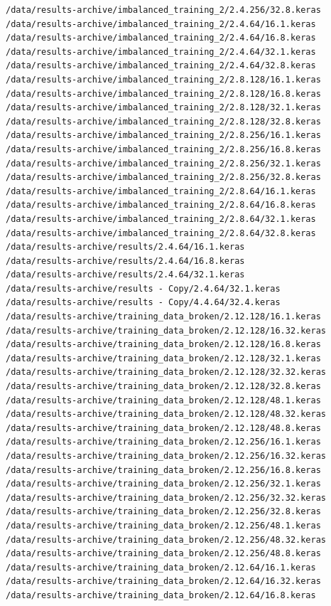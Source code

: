 \documentclass[12pt]{article}
\begin{document}
\begin{lstlisting}[style=logstyle, caption={List of failed trained models. See \ref{issues}}, label={lst:model-list}]
/data/results-archive/imbalanced_training_2/2.4.256/32.8.keras
/data/results-archive/imbalanced_training_2/2.4.64/16.1.keras
/data/results-archive/imbalanced_training_2/2.4.64/16.8.keras
/data/results-archive/imbalanced_training_2/2.4.64/32.1.keras
/data/results-archive/imbalanced_training_2/2.4.64/32.8.keras
/data/results-archive/imbalanced_training_2/2.8.128/16.1.keras
/data/results-archive/imbalanced_training_2/2.8.128/16.8.keras
/data/results-archive/imbalanced_training_2/2.8.128/32.1.keras
/data/results-archive/imbalanced_training_2/2.8.128/32.8.keras
/data/results-archive/imbalanced_training_2/2.8.256/16.1.keras
/data/results-archive/imbalanced_training_2/2.8.256/16.8.keras
/data/results-archive/imbalanced_training_2/2.8.256/32.1.keras
/data/results-archive/imbalanced_training_2/2.8.256/32.8.keras
/data/results-archive/imbalanced_training_2/2.8.64/16.1.keras
/data/results-archive/imbalanced_training_2/2.8.64/16.8.keras
/data/results-archive/imbalanced_training_2/2.8.64/32.1.keras
/data/results-archive/imbalanced_training_2/2.8.64/32.8.keras
/data/results-archive/results/2.4.64/16.1.keras
/data/results-archive/results/2.4.64/16.8.keras
/data/results-archive/results/2.4.64/32.1.keras
/data/results-archive/results - Copy/2.4.64/32.1.keras
/data/results-archive/results - Copy/4.4.64/32.4.keras
/data/results-archive/training_data_broken/2.12.128/16.1.keras
/data/results-archive/training_data_broken/2.12.128/16.32.keras
/data/results-archive/training_data_broken/2.12.128/16.8.keras
/data/results-archive/training_data_broken/2.12.128/32.1.keras
/data/results-archive/training_data_broken/2.12.128/32.32.keras
/data/results-archive/training_data_broken/2.12.128/32.8.keras
/data/results-archive/training_data_broken/2.12.128/48.1.keras
/data/results-archive/training_data_broken/2.12.128/48.32.keras
/data/results-archive/training_data_broken/2.12.128/48.8.keras
/data/results-archive/training_data_broken/2.12.256/16.1.keras
/data/results-archive/training_data_broken/2.12.256/16.32.keras
/data/results-archive/training_data_broken/2.12.256/16.8.keras
/data/results-archive/training_data_broken/2.12.256/32.1.keras
/data/results-archive/training_data_broken/2.12.256/32.32.keras
/data/results-archive/training_data_broken/2.12.256/32.8.keras
/data/results-archive/training_data_broken/2.12.256/48.1.keras
/data/results-archive/training_data_broken/2.12.256/48.32.keras
/data/results-archive/training_data_broken/2.12.256/48.8.keras
/data/results-archive/training_data_broken/2.12.64/16.1.keras
/data/results-archive/training_data_broken/2.12.64/16.32.keras
/data/results-archive/training_data_broken/2.12.64/16.8.keras

\end{lstlisting}
\end{document}
